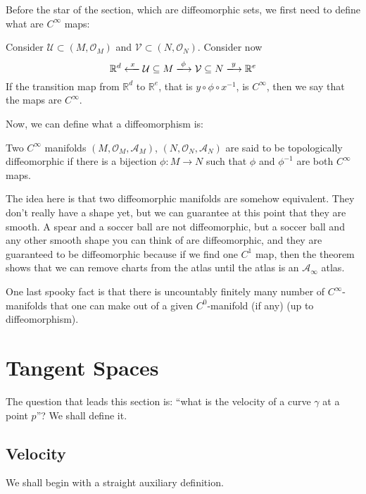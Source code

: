 Before the star of the section, which are diffeomorphic sets, we first need to define what are $C^\infty$ maps:

\begin{definition}
    Consider $\mathcal{U} \subset (M, \mathcal{O}_M)$ and $\mathcal{V} \subset (N, \mathcal{O}_N)$. Consider now
    \[
        \mathbb{R}^d \xlongleftarrow[]{x} \mathcal{U} \subseteq M \xlongrightarrow[]{\phi} \mathcal{V} \subseteq N \xlongrightarrow[]{y} \mathbb{R}^e
    \]
    If the transition map from $\mathbb{R}^d$ to $\mathbb{R}^e$, that is $y \circ \phi \circ x^{-1}$, is $C^\infty$, then we say that the maps are $C^\infty$.
\end{definition}

\noindent
Now, we can define what a diffeomorphism is:

\begin{definition}[Diffeomorphisms]
    Two $C^\infty$ manifolds $(M, \mathcal{O}_M, \mathcal{A}_M)$, $(N, \mathcal{O}_N, \mathcal{A}_N)$ are said to be topologically diffeomorphic if there is a bijection $\phi : M \longrightarrow N$ such that $\phi$ and $\phi^{-1}$ are both $C^{\infty}$ maps.
\end{definition}

The idea here is that two diffeomorphic manifolds are somehow equivalent. They don't really have a shape yet, but we can guarantee at this point that they are smooth. A spear and a soccer ball are not diffeomorphic, but a soccer ball and any other smooth shape you can think of are diffeomorphic, and they are guaranteed to be diffeomorphic because if we find one $C^1$ map, then the theorem shows that we can remove charts from the atlas until the atlas is an $\mathcal{A}_\infty$ atlas.

One last spooky fact is that there is uncountably finitely many number of $C^\infty$-manifolds that one can make out of a given $C^0$-manifold (if any) (up to diffeomorphism).

\section{Tangent Spaces}
The question that leads this section is: ``what is the velocity of a curve $\gamma$ at a point $p$''? We shall define it.

\subsection{Velocity}
We shall begin with a straight auxiliary definition.

